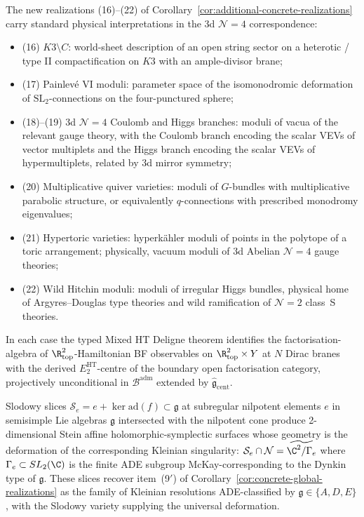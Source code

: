 \begin{rmk}\label{rmk:physical-interpretations}
The new realizations (16)--(22) of
Corollary~\ref{cor:additional-concrete-realizations} carry standard
physical interpretations in the 3d $\mathcal N=4$ correspondence:
\begin{itemize}
  \item (16) $K3\setminus C$: world-sheet description of an
        open string sector on a heterotic / type II compactification
        on $K3$ with an ample-divisor brane;
  \item (17) Painlevé VI moduli: parameter space of the isomonodromic
        deformation of $\mathrm{SL}_2$-connections on the
        four-punctured sphere;
  \item (18)--(19) 3d $\mathcal N=4$ Coulomb and Higgs branches:
        moduli of vacua of the relevant gauge theory, with the
        Coulomb branch encoding the scalar VEVs of vector multiplets
        and the Higgs branch encoding the scalar VEVs of
        hypermultiplets, related by 3d mirror symmetry;
  \item (20) Multiplicative quiver varieties: moduli of
        $G$-bundles with multiplicative parabolic structure, or
        equivalently $q$-connections with prescribed monodromy
        eigenvalues;
  \item (21) Hypertoric varieties: hyperkähler moduli of points in
        the polytope of a toric arrangement; physically, vacuum moduli
        of 3d Abelian $\mathcal N=4$ gauge theories;
  \item (22) Wild Hitchin moduli: moduli of irregular Higgs bundles,
        physical home of Argyres--Douglas type theories and
        wild ramification of $\mathcal N=2$ class~S theories.
\end{itemize}
In each case the typed Mixed HT Deligne theorem identifies the
factorisation-algebra of $\R^2_{\mathrm{top}}$-Hamiltonian BF
observables on $\R^2_{\mathrm{top}}\times Y$ at $N$ Dirac branes with
the derived $E_2^{\mathrm{HT}}$-centre of the boundary open
factorisation category, projectively unconditional in
$\mathcal B^{\mathrm{adm}}$ extended by
$\widehat{\mathfrak g}_{\mathrm{cent}}$.
\end{rmk}

\begin{rmk}\label{rmk:slodowy-slices}
Slodowy slices \(\mathcal S_e=e+\ker\mathrm{ad}(f)\subset\mathfrak g\)
at subregular nilpotent elements $e$ in semisimple Lie algebras
$\mathfrak g$ intersected with the nilpotent cone produce
2-dimensional Stein affine holomorphic-symplectic surfaces whose
geometry is the deformation of the corresponding Kleinian
singularity:
$\mathcal S_e\cap\mathcal N=\widetilde{\C^2/\Gamma_e}$ where
$\Gamma_e\subset SL_2(\C)$ is the finite ADE subgroup
McKay-corresponding to the Dynkin type of $\mathfrak g$.  These
slices recover item~(9$'$) of
Corollary~\ref{cor:concrete-global-realizations} as the family of
Kleinian resolutions ADE-classified by $\mathfrak g\in\{A,D,E\}$,
with the Slodowy variety supplying the universal deformation.
\end{rmk}

